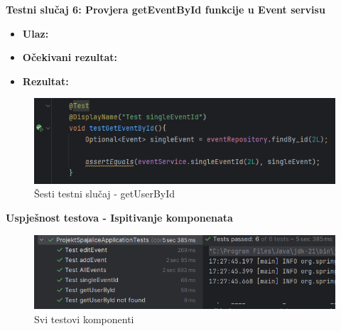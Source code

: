 						
						
			\noindent \textbf{Testni slučaj 6: Provjera getEventById funkcije u Event servisu}
						\begin{itemize}
	
						\item[] \textbf{Ulaz: }
						\item[] \textbf{Očekivani rezultat: }
						\item[] \textbf{Rezultat: }
						\end{itemize}
						
						\begin{figure}[H]
							\includegraphics[width=\textwidth]{slike/IKTest6.PNG} %
							\caption{Šesti testni slučaj - getUserById}
							\label{fig:IKT6} %
						\end{figure}
						\eject
						
				\noindent \textbf{Uspješnost testova - Ispitivanje komponenata}
						\begin{figure}[H]
							\includegraphics[width=\textwidth]{slike/IKTestovi.PNG} %
							\caption{Svi testovi komponenti}
							\label{fig:IKTS} %
						\end{figure}
						\eject
						
